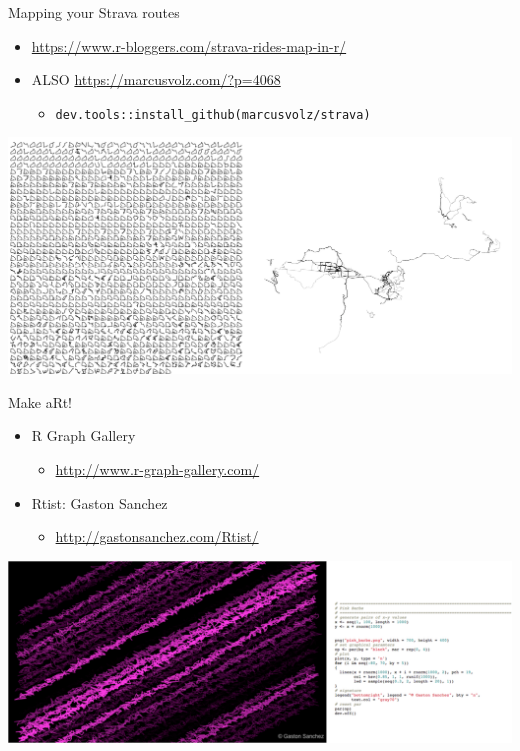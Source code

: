 \documentclass[ignorenonframetext,]{beamer}
\providecommand{\tightlist}{%
  \setlength{\itemsep}{0pt}\setlength{\parskip}{0pt}}
\begin{document}
\begin{frame}[fragile]{Mapping your Strava routes}
\protect\hypertarget{mapping-your-strava-routes}{}

\begin{itemize}
\tightlist
\item
  \url{https://www.r-bloggers.com/strava-rides-map-in-r/}
\item
  ALSO \url{https://marcusvolz.com/?p=4068}

  \begin{itemize}
  \tightlist
  \item
    \texttt{dev.tools::install\_github(marcusvolz/strava)}
  \end{itemize}
\end{itemize}

\includegraphics{../external/images/funR_4_strava_combo.png}

\end{frame}

\begin{frame}{Make aRt!}
\protect\hypertarget{make-art}{}

\begin{itemize}
\tightlist
\item
  R Graph Gallery

  \begin{itemize}
  \tightlist
  \item
    \url{http://www.r-graph-gallery.com/}
  \end{itemize}
\item
  Rtist: Gaston Sanchez

  \begin{itemize}
  \tightlist
  \item
    \url{http://gastonsanchez.com/Rtist/}
  \end{itemize}
\end{itemize}

\includegraphics{../external/images/funR_5_aRt_pink_combo.png}

\end{frame}
\end{document}
